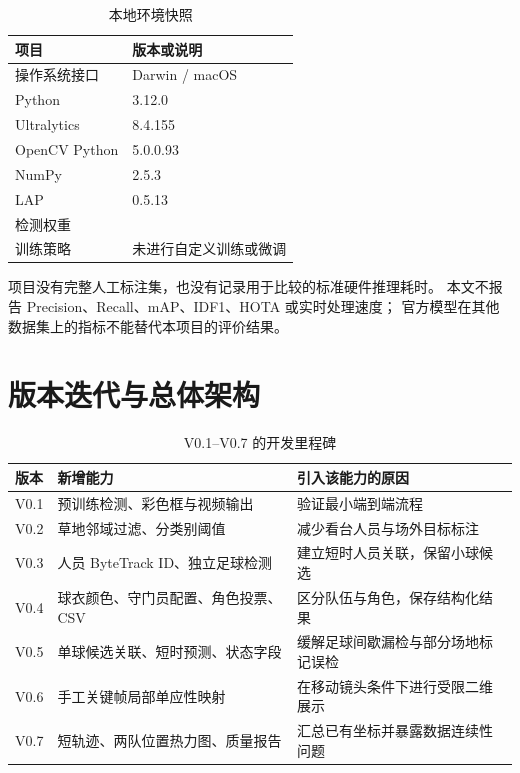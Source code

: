 \documentclass[UTF8,fontset=fandol,11pt,a4paper]{ctexart}
\newcommand{\code}[1]{\texttt{\detokenize{#1}}}
\begin{document}
\begin{table}[htbp]
\centering
\caption{本地环境快照}
\label{tab:env}
\begin{tabular}{ll}
\toprule
项目 & 版本或说明\\
\midrule
操作系统接口 & Darwin / macOS\\
Python & 3.12.0\\
Ultralytics & 8.4.155\\
OpenCV Python & 5.0.0.93\\
NumPy & 2.5.3\\
LAP & 0.5.13\\
检测权重 & \code{yolo11n.pt}\\
训练策略 & 未进行自定义训练或微调\\
\bottomrule
\end{tabular}
\end{table}

项目没有完整人工标注集，也没有记录用于比较的标准硬件推理耗时。
本文不报告 Precision、Recall、mAP、IDF1、HOTA 或实时处理速度；
官方模型在其他数据集上的指标不能替代本项目的评价结果。

\section{版本迭代与总体架构}

\begin{table}[htbp]
\centering
\caption{V0.1--V0.7 的开发里程碑}
\label{tab:versions}
\small
\begin{tabularx}{\linewidth}{@{}lLL@{}}
\toprule
版本 & 新增能力 & 引入该能力的原因\\
\midrule
V0.1 & 预训练检测、彩色框与视频输出 & 验证最小端到端流程\\
V0.2 & 草地邻域过滤、分类别阈值 & 减少看台人员与场外目标标注\\
V0.3 & 人员 ByteTrack ID、独立足球检测 & 建立短时人员关联，保留小球候选\\
V0.4 & 球衣颜色、守门员配置、角色投票、CSV & 区分队伍与角色，保存结构化结果\\
V0.5 & 单球候选关联、短时预测、状态字段 & 缓解足球间歇漏检与部分场地标记误检\\
V0.6 & 手工关键帧局部单应性映射 & 在移动镜头条件下进行受限二维展示\\
V0.7 & 短轨迹、两队位置热力图、质量报告 & 汇总已有坐标并暴露数据连续性问题\\
\bottomrule
\end{tabularx}
\end{table}
\end{document}
